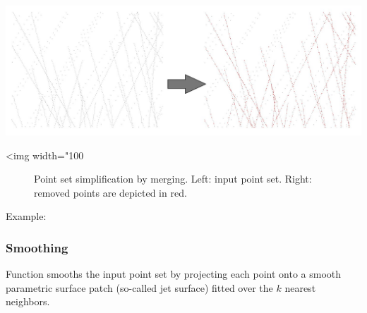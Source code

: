 \begin{center}
    \label{Point_set_processing_3-fig-merge_simplification}
    \begin{ccTexOnly}
        \includegraphics[width=1.0\textwidth]{Point_set_processing_3/merge_simplification} %
    \end{ccTexOnly}
    \begin{ccHtmlOnly}
        <img width="100%
    \end{ccHtmlOnly}
    \begin{figure}[h]
        \caption{Point set simplification by merging.
                 Left: input point set.
                 Right: removed points are depicted in red.}
    \end{figure}
\end{center}

Example:


\subsubsection{Smoothing}

Function  smooths the input point set by projecting each point onto a smooth parametric surface patch (so-called jet surface) fitted over the $k$ nearest neighbors. \\


